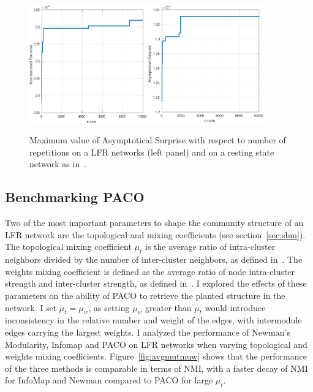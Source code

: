 \noindent\begin{figure}[!htb]
\centering
\includegraphics[width=0.45\textwidth]{images/paco_variability_nreps_lfr.png}\includegraphics[width=0.45\textwidth]{images/paco_variability_nreps_bullmore.png}
\caption{Maximum value of Asymptotical Surprise with respect to number of repetitions on a LFR networks (left panel) and on a resting state network as in~\cite{crossley2013a}.}
\label{fig:paco_variability}
\end{figure}


\subsection{Benchmarking PACO}
Two of the most important parameters to shape the community structure of an LFR network are the topological and mixing coefficients (see section~\ref{sec:sbm}).
The topological mixing coefficient $\mu_t$ is the average ratio of intra-cluster neighbors divided by the number of inter-cluster neighbors, as defined in~\cite{lancichinetti2008}.
The weights mixing coefficient is defined as the average ratio of node intra-cluster strength and inter-cluster strength, as defined in~\cite{lancichinetti2009a}.
I explored the effects of these parameters on the ability of PACO to retrieve the planted structure in the network.
I set $\mu_t=\mu_w$, as setting $\mu_w$ greater than $\mu_t$ would introduce inconsistency in the relative number and weight of the edges, with intermodule edges carrying the largest weights.
I analyzed the performance of Newman's Modularity, Infomap and PACO on LFR networks when varying topological and weights mixing coefficients.
Figure~\ref{fig:avgmutmuw} shows that the performance of the three methods is comparable in terms of NMI, with a faster decay of NMI for InfoMap and Newman compared to PACO for large $\mu_t$.

